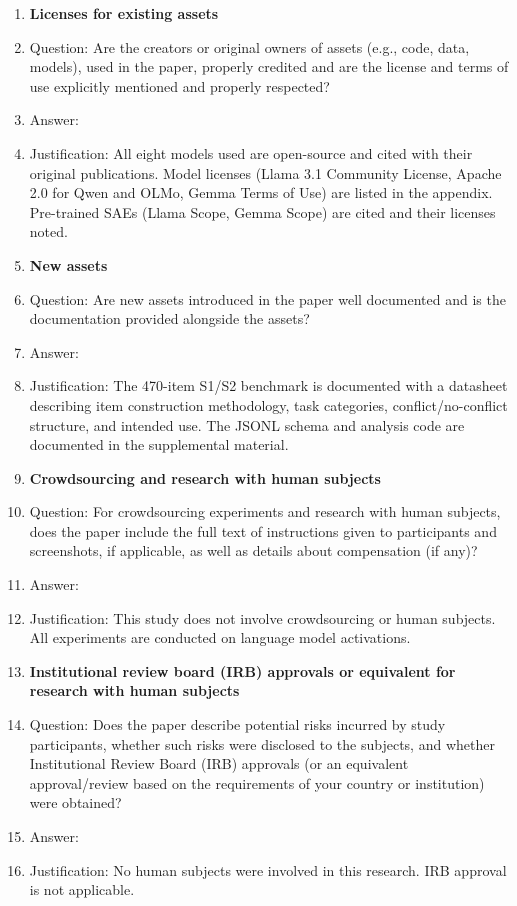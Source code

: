 \begin{enumerate}
\item {\bf Licenses for existing assets}
    \item[] Question: Are the creators or original owners of assets (e.g., code, data, models), used in the paper, properly credited and are the license and terms of use explicitly mentioned and properly respected?
    \item[] Answer: \answerYes{}
    \item[] Justification: All eight models used are open-source and cited with their original publications. Model licenses (Llama 3.1 Community License, Apache 2.0 for Qwen and OLMo, Gemma Terms of Use) are listed in the appendix. Pre-trained SAEs (Llama Scope, Gemma Scope) are cited and their licenses noted.
\item {\bf New assets}
    \item[] Question: Are new assets introduced in the paper well documented and is the documentation provided alongside the assets?
    \item[] Answer: \answerYes{}
    \item[] Justification: The 470-item S1/S2 benchmark is documented with a datasheet describing item construction methodology, task categories, conflict/no-conflict structure, and intended use. The JSONL schema and analysis code are documented in the supplemental material.
\item {\bf Crowdsourcing and research with human subjects}
    \item[] Question: For crowdsourcing experiments and research with human subjects, does the paper include the full text of instructions given to participants and screenshots, if applicable, as well as details about compensation (if any)?
    \item[] Answer: \answerNA{}
    \item[] Justification: This study does not involve crowdsourcing or human subjects. All experiments are conducted on language model activations.
\item {\bf Institutional review board (IRB) approvals or equivalent for research with human subjects}
    \item[] Question: Does the paper describe potential risks incurred by study participants, whether such risks were disclosed to the subjects, and whether Institutional Review Board (IRB) approvals (or an equivalent approval/review based on the requirements of your country or institution) were obtained?
    \item[] Answer: \answerNA{}
    \item[] Justification: No human subjects were involved in this research. IRB approval is not applicable.

\end{enumerate}
